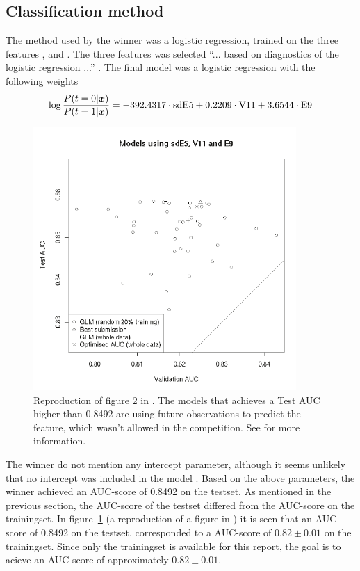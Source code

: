 \subsection{Classification method}
The method used by the winner was a logistic regression, trained on the three features ,  and . The three features was selected ``... based on diagnostics of the logistic regression ...'' \citep[p.3]{inference_winning_approach}. The final model was a logistic regression with the following weights
\[
    \log\frac{P(t=0|\boldsymbol{x})}{P(t=1|\boldsymbol{x})} = -392.4317\cdot\text{sdE5} + 0.2209\cdot\text{V11} + 3.6544\cdot\text{E9}
\]
\begin{figure}\label{fig:auc-score-inference-paper}
    \centering
    \includegraphics[width=100mm]{media/fig2-inference-paper.pdf}
    \caption{Reproduction of figure 2 in \citet{inference_winning_approach}. The models that achieves a Test AUC higher than 0.8492 are using future observations to predict the  feature, which wasn't allowed in the competition. See \citet{inference_winning_approach} for more information.}
\end{figure}
The winner do not mention any intercept parameter, although it seems unlikely that no intercept was included in the model \citep{meetings-morten}. Based on the above parameters, the winner achieved an AUC-score of 0.8492 on the testset. As mentioned in the previous section, the AUC-score of the testset differed from the AUC-score on the trainingset. In figure~\ref{fig:auc-score-inference-paper} (a reproduction of a figure in \citet{inference_winning_approach}) it is seen that an AUC-score of 0.8492 on the testset, corresponded to a AUC-score of $0.82\pm0.01$ on the trainingset. Since only the trainingset is available for this report, the goal is to acieve an AUC-score of approximately $0.82\pm0.01$.

